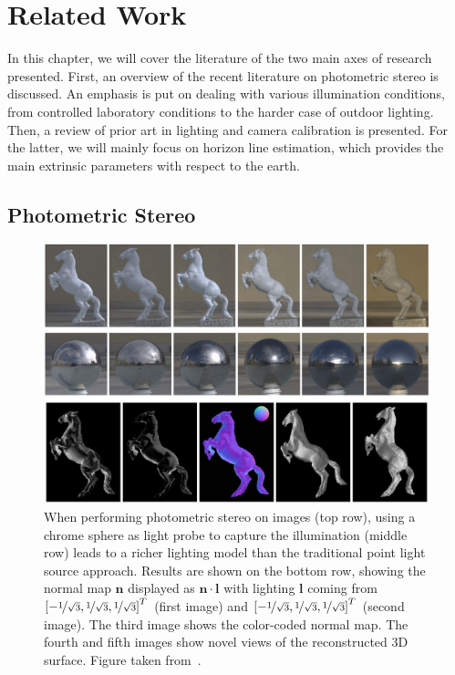 \chapter{Related Work}

In this chapter, we will cover the literature of the two main axes of research presented. First, an overview of the recent literature on photometric stereo is discussed. An emphasis is put on dealing with various illumination conditions, from controlled laboratory conditions to the harder case of outdoor lighting. Then, a review of prior art in lighting and camera calibration is presented. For the latter, we will mainly focus on horizon line estimation, which provides the main extrinsic parameters with respect to the earth.


\section{Photometric Stereo}


\begin{figure}
\centering
\includegraphics[width=0.96\linewidth]{3rdparty/yu-summary.png}
\caption[State-of-the-art calibrated photometric stereo]{When performing photometric stereo on images (top row), using a chrome sphere as light probe to capture the illumination (middle row) leads to a richer lighting model than the traditional point light source approach. Results are shown on the bottom row, showing the normal map $\mathbf{n}$ displayed as $\mathbf{n}\cdot\mathbf{l}$ with lighting $\mathbf{l}$ coming from $\left[-\nicefrac{1}{\sqrt{3}}, \nicefrac{1}{\sqrt{3}}, \nicefrac{1}{\sqrt{3}}\right]^T$ (first image) and $\left[-\nicefrac{1}{\sqrt{3}}, \nicefrac{1}{\sqrt{3}}, \nicefrac{1}{\sqrt{3}}\right]^T$ (second image). The third image shows the color-coded normal map. The fourth and fifth images show novel views of the reconstructed 3D surface. Figure taken from~\cite{yu-iccp-13}.}
\label{fig:yu_summary}
\end{figure}

